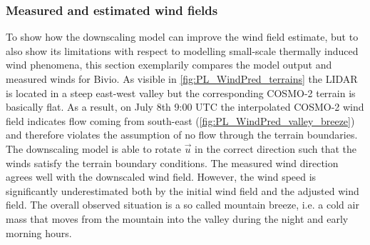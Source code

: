 \documentclass[twocolumn,letterpaper]{IEEEAerospaceCLS}
\begin{document}
\subsubsection{Measured and estimated wind fields}
\label{sec:PL_WindPred_phenomena}

To show how the downscaling model can improve the wind field estimate, but to also show its limitations with respect to modelling small-scale thermally induced wind phenomena, this section exemplarily compares the model output and measured winds for Bivio. As visible in \cref{fig:PL_WindPred_terrains} the LIDAR is located in a steep east-west valley but the corresponding COSMO-2 terrain is basically flat. As a result, on July 8th 9:00 UTC the interpolated COSMO-2 wind field indicates flow coming from south-east (\cref{fig:PL_WindPred_valley_breeze}) and therefore violates the assumption of no flow through the terrain boundaries. The downscaling model is able to rotate $\vec{u}$ in the correct direction such that the winds satisfy the terrain boundary conditions. The measured wind direction agrees well with the downscaled wind field. However, the wind speed is significantly underestimated both by the initial wind field and the adjusted wind field. The overall observed situation is a so called mountain breeze, i.e. a cold air mass that moves from the mountain into the valley during the night and early morning hours. 
\end{document}
